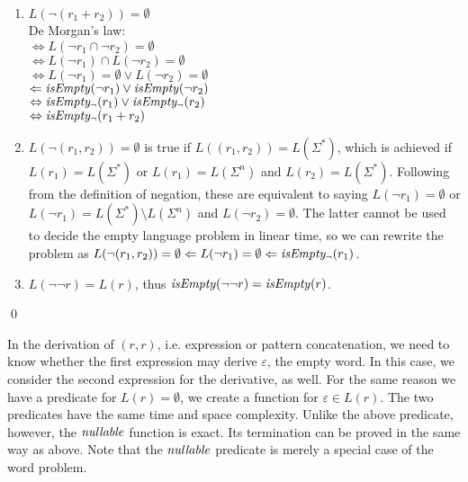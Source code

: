 \begin{lem}
\begin{enumerate}[label=\textbf{(\arabic*)}]
      \item
         $L(\neg(r_1 + r_2)) = \emptyset$ \\
         De Morgan's law: \\
         $\Leftrightarrow L(\neg r_1 \cap \neg r_2) = \emptyset$ \\
         $\Leftrightarrow L(\neg r_1) \cap L(\neg r_2) = \emptyset$ \\
         $\Leftrightarrow L(\neg r_1) = \emptyset \vee L(\neg r_2) = \emptyset$ \\
         $\Leftarrow \mathit{isEmpty}(\neg r_1) \vee \mathit{isEmpty}(\neg r_2)$ \\
         $\Leftrightarrow \mathit{isEmpty_\neg}(r_1) \vee \mathit{isEmpty_\neg}(r_2)$ \\
         $\Leftrightarrow \mathit{isEmpty_\neg}(r_1 + r_2)$

      \item
         $L(\neg(r_1, r_2)) = \emptyset$ is true if $L((r_1, r_2)) =
         L(\Sigma^*)$, which is achieved if $L(r_1) = L(\Sigma^*)$ or $L(r_1) =
         L(\Sigma^n)$ and $L(r_2)= L(\Sigma^*)$. Following from the definition
         of negation, these are equivalent to saying $L(\neg r_1) = \emptyset$
         or $L(\neg r_1) = L(\Sigma^*) \setminus L(\Sigma^n)$ and $L(\neg r_2) =
         \emptyset$. The latter cannot be used to decide the empty language
         problem in linear time, so we can rewrite the problem as $L(\neg(r_1,
         r_2)) = \emptyset \Leftarrow L(\neg r_1) = \emptyset \Leftarrow
         \mathit{isEmpty_\neg}(r_1)$.

      \item
         $L(\neg\neg r) = L(r)$, thus $\mathit{isEmpty}(\neg\neg r) = \mathit{isEmpty}(r)$.

   \end{enumerate}

   \qed
\end{lem}


In the derivation of $(r,r)$, i.e. expression or pattern concatenation, we need
to know whether the first expression may derive $\varepsilon$, the empty word.
In this case, we consider the second expression for the derivative, as well. For
the same reason we have a predicate for $L(r) = \emptyset$, we create a function
for $\varepsilon \in L(r)$. The two predicates have the same time and space
complexity. Unlike the above predicate, however, the $\mathit{nullable}$ function is
exact. Its termination can be proved in the same way as above. Note that the
$\mathit{nullable}$ predicate is merely a special case of the word problem.

